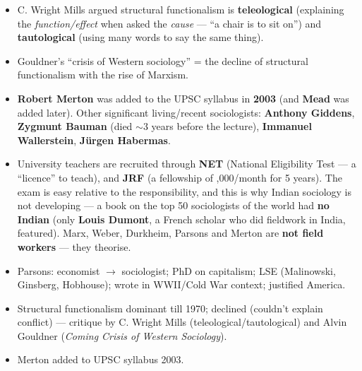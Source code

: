 \begin{CriticalPoint}
\begin{itemize}
\item C. Wright Mills argued structural functionalism is \textbf{teleological} (explaining the \textit{function/effect} when asked the \textit{cause} --- ``a chair is to sit on'') and \textbf{tautological} (using many words to say the same thing).
\item Gouldner's ``crisis of Western sociology'' = the decline of structural functionalism with the rise of Marxism.
\end{itemize}
\end{CriticalPoint}

\begin{DataFact}
\begin{itemize}
\item \textbf{Robert Merton} was added to the UPSC syllabus in \textbf{2003} (and \textbf{Mead} was added later). Other significant living/recent sociologists: \textbf{Anthony Giddens}, \textbf{Zygmunt Bauman} (died $\sim$3 years before the lecture), \textbf{Immanuel Wallerstein}, \textbf{Jürgen Habermas}.
\end{itemize}
\end{DataFact}

\begin{CriticalPoint}
\begin{itemize}
\item University teachers are recruited through \textbf{NET} (National Eligibility Test --- a ``licence'' to teach), and \textbf{JRF} (a fellowship of ,000/month for 5 years). The exam is easy relative to the responsibility, and this is why Indian sociology is not developing --- a book on the top 50 sociologists of the world had \textbf{no Indian} (only \textbf{Louis Dumont}, a French scholar who did fieldwork in India, featured). Marx, Weber, Durkheim, Parsons and Merton are \textbf{not field workers} --- they theorise.
\end{itemize}
\end{CriticalPoint}

\begin{QuickRevision}
\begin{itemize}
\item Parsons: economist $\rightarrow$ sociologist; PhD on capitalism; LSE (Malinowski, Ginsberg, Hobhouse); wrote in WWII/Cold War context; justified America.
\item Structural functionalism dominant till 1970; declined (couldn't explain conflict) --- critique by C. Wright Mills (teleological/tautological) and Alvin Gouldner (\textit{Coming Crisis of Western Sociology}).
\item Merton added to UPSC syllabus 2003.
\end{itemize}
\end{QuickRevision}

